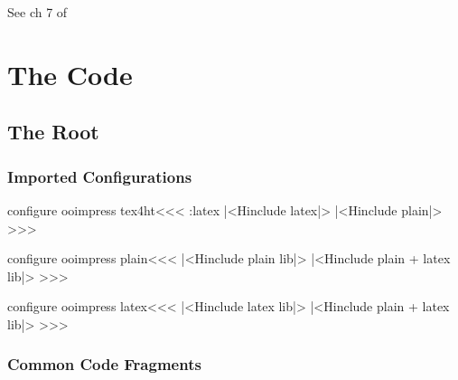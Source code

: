 

\ifx \HTML\UnDef
   \def\HTML{ooimpress}%
   \def\PREAMBLE{%
      \usepackage{url}%
      \usepackage{hyperref}%
   }
   \def\OPTIONS{html,sections+,3}%
   \def\CONFIG{\jobname}
   \def\MAKETITLE{\author{Eitan M. Gurari, 
                          James Naughton, and Maarten Wisse}}         
   \def\next{  \endinput}
   \expandafter\next
\fi




See ch 7 of \cite{odbook}

\chapter{The Code}

\section{The Root}

\subsection{Imported Configurations}


\<configure ooimpress tex4ht\><<<
\if:latex  |<Hinclude latex|>
\else      |<Hinclude plain|>  \fi
>>>


\<configure ooimpress plain\><<<
|<Hinclude plain lib|>
|<Hinclude plain + latex lib|>
>>>

\<configure ooimpress latex\><<<
|<Hinclude latex lib|>
|<Hinclude plain + latex lib|>
>>>

\subsection{Common Code Fragments}

